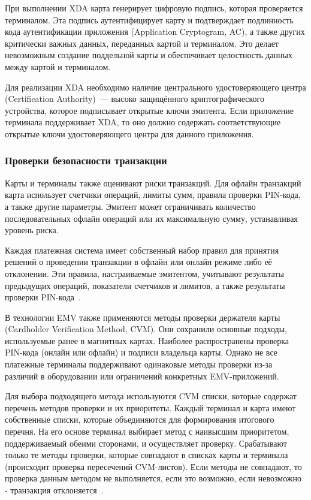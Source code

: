 При выполнении XDA карта генерирует цифровую подпись, которая проверяется терминалом.
Эта подпись аутентифицирует карту и подтверждает подлинность кода аутентификации приложения (Application Cryptogram, AC), а также других критически важных данных, переданных картой и терминалом.
Это делает невозможным создание поддельной карты и обеспечивает целостность данных между картой и терминалом.

Для реализации XDA необходимо наличие центрального удостоверяющего центра (Certification Authority)~--- высоко защищённого криптографического устройства, которое подписывает открытые ключи эмитента.
Если приложение терминала поддерживает XDA, то оно должно содержать соответствующие открытые ключи удостоверяющего центра для данного приложения.

\subsubsection{Проверки безопасности транзакции}

Карты и терминалы также оценивают риски транзакций.
Для офлайн транзакций карта использует счетчики операций, лимиты сумм, правила проверки PIN-кода, а также другие параметры.
Эмитент может ограничивать количество последовательных офлайн операций или их максимальную сумму, устанавливая уровень риска.

Каждая платежная система имеет собственный набор правил для принятия решений о проведении транзакции в офлайн или онлайн режиме либо её отклонении.
Эти правила, настраиваемые эмитентом, учитывают результаты предыдущих операций, показатели счетчиков и лимитов, а также результаты проверки PIN-кода~\cite{secure_nfc_mc}.


В технологии EMV также применяются методы проверки держателя карты (Cardholder Verification Method, CVM).
Они сохранили основные подходы, используемые ранее в магнитных картах.
Наиболее распространены проверка PIN-кода (онлайн или офлайн) и подписи владельца карты.
Однако не все платежные терминалы поддерживают одинаковые методы проверки из-за различий в оборудовании или ограничений конкретных EMV-приложений.

Для выбора подходящего метода используются CVM списки, которые содержат перечень методов проверки и их приоритеты.
Каждый терминал и карта имеют собственные списки, которые объединяются для формирования итогового перечня.
На его основе терминал выбирает метод с наивысшим приоритетом, поддерживаемый обеими сторонами, и осуществляет проверку.
Срабатывают только те методы проверки, которые совпадают в списках карты и терминала (происходит проверка пересечений CVM-листов).
Если методы не совпадают, то проверка данным методом не выполняется, если это возможно, если невозможно - транзакция отклоняется~\cite{emv_card_mechanism, emv_book_3}.

